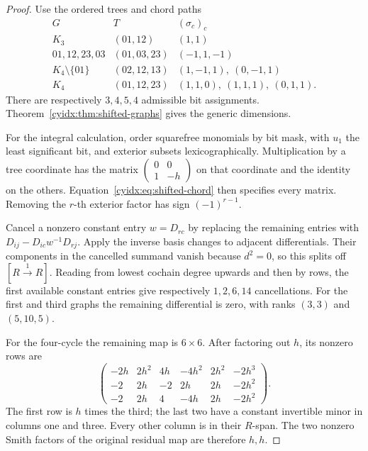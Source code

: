 \begin{proof}
Use the ordered trees and chord paths
\[
\begin{array}{c|c|c}
G&T&(\sigma_c)_c\\\hline
K_3&(01,12)&(1,1)\\
01,12,23,03&(01,03,23)&(-1,1,-1)\\
K_4\setminus\{01\}&(02,12,13)&(1,-1,1),\ (0,-1,1)\\
K_4&(01,12,23)&(1,1,0),\ (1,1,1),\ (0,1,1).
\end{array}
\]
There are respectively \(3,4,5,4\) admissible bit
assignments. Theorem~\ref{cyidx:thm:shifted-graphs}
gives the generic dimensions.

For the integral calculation, order squarefree
monomials by bit mask, with \(u_1\) the least
significant bit, and exterior subsets lexicographically.
Multiplication by a tree coordinate has the matrix
\(\left(\begin{smallmatrix}0&0\\1&-h\end{smallmatrix}\right)\)
on that coordinate and the identity on the others.
Equation~\eqref{cyidx:eq:shifted-chord} then specifies
every matrix. Removing the \(r\)-th exterior factor
has sign \((-1)^{r-1}\).

Cancel a nonzero constant entry \(w=D_{rc}\) by
replacing the remaining entries with
\(D_{ij}-D_{ic}w^{-1}D_{rj}\). Apply the inverse
basis changes to adjacent differentials. Their
components in the cancelled summand vanish because
\(d^2=0\), so this splits off
\([R\xrightarrow{1}R]\). Reading from lowest
cochain degree upwards and then by rows, the first
available constant entries give respectively
\(1,2,6,14\) cancellations. For the first and third
graphs the remaining differential is zero, with
ranks \((3,3)\) and \((5,10,5)\).

For the four-cycle the remaining map is \(6\times6\).
After factoring out \(h\), its nonzero rows are
\[
 \begin{pmatrix}
 -2h&2h^2&4h&-4h^2&2h^2&-2h^3\\
 -2&2h&-2&2h&2h&-2h^2\\
 -2&2h&4&-4h&2h&-2h^2
 \end{pmatrix}.
\]
The first row is \(h\) times the third; the last
two have a constant invertible minor in columns
one and three. Every other column is in their
\(R\)-span. The two nonzero Smith factors of the
original residual map are therefore \(h,h\).


\end{proof}
